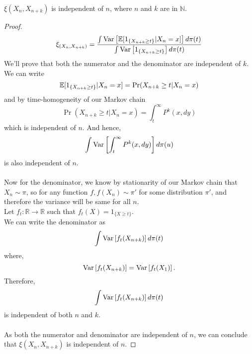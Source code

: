 \begin{theorem}
    $\xi(X_n, X_{n+k})$ is independent of $n$, where $n$ and $k$ are in $\mathbb{N}$.
    \begin{proof}
        \begin{equation}
            \xi_{(X_n, X_{n+k})} = \frac{\int \text{Var}\left[{{\mathbb{E}[1_{\{X_{n+k} \geq t\}}|X_n=x]}}\right] d\pi(t)}{\int \text{Var}\left[{{1_{\{X_{n+k} \geq t\}}}}\right] d\pi(t)}
        \end{equation}
        We'll prove that both the numerator and the denominator are independent of $k$. \\
        We can write
        \begin{equation*}
            \mathbb{E}[1_{\{X_{n+k} \geq t\}}|X_n=x] = \Pr(X_{n+k} \geq t|X_n=x) \\
        \end{equation*}
        and by time-homogeneity of our Markov chain
        \begin{equation*}
            \Pr(X_{n+k} \geq t|X_n=x) = \int_t^{\infty} P^k(x, dy)
        \end{equation*}
        which is independent of $n$. And hence,
        \begin{equation}
            \int \text{Var}\left[{{\int_t^{\infty} P^k(x, dy)}}\right] d\pi(u)
        \end{equation}
        is also independent of $n$.\\\\
        Now for the denominator, we know by stationarity of our Markov chain that $X_n \sim \pi$, so for any function $f, f(X_n) \sim \pi'$ for some distribution $\pi'$, and therefore the variance will be same for all $n$.\\
        Let $f_t: \mathbb{R} \rightarrow \mathbb{R}$ such that $f_t(X) = 1_{\{X \geq t\}}$.\\
        We can write the denominator as
        $$\int \text{Var}\left[{{f_t(X_{n+k})}}\right] d\pi(t)$$
        where,
        $$\text{Var}\left[{{f_t(X_{n+k})}}\right] = \text{Var}\left[{{f_t(X_{1})}}\right].$$
        Therefore,
        $$\int \text{Var}\left[{{f_t(X_{n+k})}}\right] d\pi(t)$$
        is independent of both $n$ and $k$.\\\\
        As both the numerator and denominator are independent of $n$, we can conclude that $\xi(X_n, X_{n+k})$ is independent of $n$.
    \end{proof}
\end{theorem}

